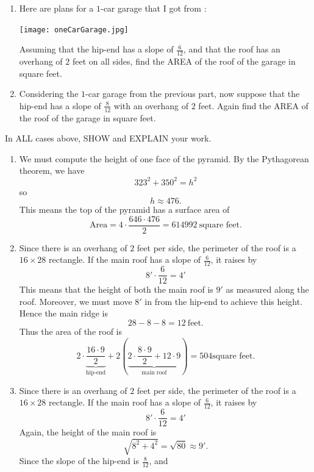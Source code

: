 \documentclass[hints,nooutcomes,noauthor,handout]{ximera}
\begin{document}
\begin{question}
\begin{enumerate}
\item Here are plans for a $1$-car garage that I got from :
   \begin{center}
     \texttt{[image: oneCarGarage.jpg]}
   \end{center}
   Assuming that the hip-end has a slope of $\frac{6}{12}$, and that
   the roof has an overhang of $2$ feet on all sides, find the AREA of
   the roof of the garage in square feet.
 \item Considering the $1$-car garage from the previous part, now
   suppose that the hip-end has a slope of $\frac{8}{12}$ with an
   overhang of $2$ feet. Again find the AREA of the roof of the
   garage in square feet.
\end{enumerate}
In ALL cases above, SHOW and EXPLAIN your work.
\begin{freeResponse}
  \begin{enumerate}
    \item We must compute the height of one face of the pyramid. By
      the Pythagorean theorem, we have
      \[
      323^2 + 350^2 = h^2
      \]
      so
      \[
      h \approx 476.
      \]
      This means the top of the pyramid has a surface area of
      \[
      \text{Area} = 4\cdot \frac{646\cdot 476}{2} = 614992~\text{square feet}.
      \]
    \item Since there is an overhang of $2$ feet per side, the
      perimeter of the roof is a $16\times 28$ rectangle. If the main
      roof has a slope of $\frac{6}{12}$, it raises by
      \[
      8'\cdot \frac{6}{12}  = 4'
      \]
      This means that the height of both the main roof is $9'$ as
      measured along the roof. Moreover, we must move $8'$ in from the
      hip-end to achieve this height. Hence the main ridge is
      \[
      28-8-8 = 12~\text{feet}.
      \]
      Thus the area of the roof is
      \[
      2\cdot \underbrace{\frac{16\cdot 9}{2}}_{\text{hip-end}} +
      2\left(\underbrace{2\cdot \frac{8\cdot 9}{2} + 12\cdot
        9}_{\text{main roof}}\right) = 504 \text{square feet}.
      \]
    \item Since there is an overhang of $2$ feet per side, the
      perimeter of the roof is a $16\times 28$ rectangle. If the main
      roof has a slope of $\frac{6}{12}$, it raises by
      \[
      8'\cdot \frac{6}{12}  = 4'
      \]
      Again, the height of the main roof is
      \[
      \sqrt{8^2+4^2} = \sqrt{80}\approx 9'.
      \]
      Since the slope of the hip-end is $\frac{8}{12}$, and

\end{enumerate}
\end{freeResponse}
\end{question}
\end{document}
